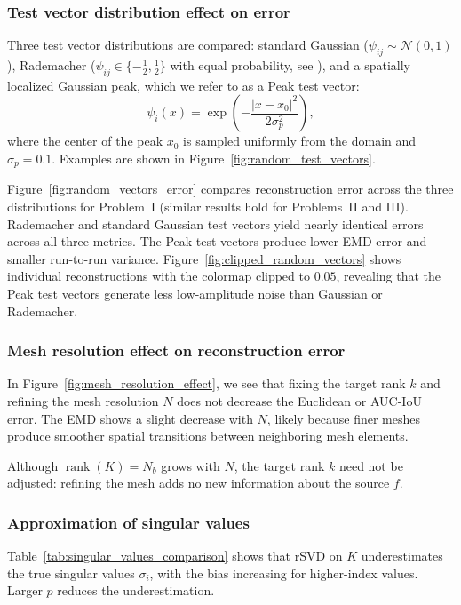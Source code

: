\subsubsection{Test vector distribution effect on error}\label{sec:test_vector_distribution_effect_on_error}

Three test vector distributions are compared: standard Gaussian ($\psi_{ij} \sim \mathcal{N}(0,1)$), Rademacher ($\psi_{ij} \in \{-\tfrac{1}{2}, \tfrac{1}{2}\}$ with equal probability, see \cite{montgomery-smithDistributionRademacherSums1990}), and a spatially localized Gaussian peak, which we refer to as a Peak test vector:
\begin{equation*}
    \psi_i(x) = \exp\left(-\frac{|x - x_0|^2}{2\sigma_p^2}\right),
\end{equation*}
where the center of the peak $x_0$ is sampled uniformly from the domain and $\sigma_p = 0.1$. Examples are shown in Figure~\ref{fig:random_test_vectors}.



Figure~\ref{fig:random_vectors_error} compares reconstruction error across the three distributions for Problem~I (similar results hold for Problems~II and III). Rademacher and standard Gaussian test vectors yield nearly identical errors across all three metrics. The Peak test vectors produce lower EMD error and smaller run-to-run variance. Figure~\ref{fig:clipped_random_vectors} shows individual reconstructions with the colormap clipped to $0.05$, revealing that the Peak test vectors generate less low-amplitude noise than Gaussian or Rademacher.


\subsubsection{Mesh resolution effect on reconstruction error}\label{sec:mesh_resolution_effect_on_reconstruction_error}

In Figure~\ref{fig:mesh_resolution_effect}, we see that fixing the target rank $k$ and refining the mesh resolution $N$ does not decrease the Euclidean or AUC-IoU error. The EMD shows a slight decrease with $N$, likely because finer meshes produce smoother spatial transitions between neighboring mesh elements.

Although $\operatorname{rank}(K) = N_b$ grows with $N$, the target rank $k$ need not be adjusted: refining the mesh adds no new information about the source $f$.


\subsubsection{Approximation of singular values}\label{sec:approximation_of_singular_values}

Table~\ref{tab:singular_values_comparison} shows that rSVD on $K$ underestimates the true singular values $\sigma_i$, with the bias increasing for higher-index values. Larger $p$ reduces the underestimation.

